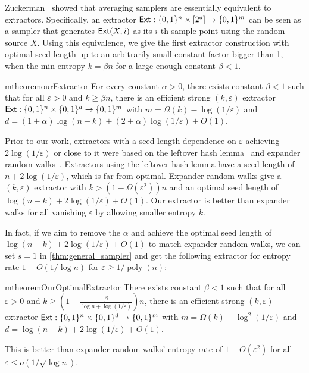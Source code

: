 \documentclass[11pt,letterpaper]{article}
\DeclareMathOperator*{\poly}{poly}
\newcommand{\eps}{\varepsilon}
\newcommand{\1}{\mathbbm{1}}
\newcommand{\zo}{\{0, 1\}}
\newcommand{\Ext}{\textup{\textsf{Ext}}}
\begin{document}
Zuckerman~\cite{zuckerman1997randomness} showed that averaging samplers are essentially equivalent to extractors. Specifically, an extractor $\Ext: \zo^n \times [2^d] \to \zo^m$ can be seen as a sampler that generates $\Ext(X, i)$ as its $i$-th sample point using the random source $X$. Using this equivalence, we give the first extractor construction with optimal seed length up to an arbitrarily small constant factor bigger than 1, when the min-entropy $k = \beta n$ for a large enough constant $\beta < 1$.


\begin{restatable}{mtheorem}{ourExtractor}
    \label{thm:our_extractor}
    For every constant $\alpha > 0$, there exists constant $\beta < 1$ such that for all $\eps > 0$ and $k \ge  \beta n$, there is an efficient strong $(k, \eps)$ extractor $\Ext : \zo^n \times \zo^d \to \zo^m$ with $m = \Omega(k) - \log(1 / \eps)$ and $d = (1 + \alpha)\log (n-k) + (2 + \alpha) \log (1 / \eps) + O(1)$.
\end{restatable}

Prior to our work, extractors with a seed length dependence on $\eps$ achieving $2\log(1/\eps)$ or close to it were based on the leftover hash lemma~\cite{ILL89, BBR, IZ, HILL} and expander random walks~\cite{Gil93, Zuc07}. Extractors using the leftover hash lemma have a seed length of $n + 2 \log(1 / \eps)$, which is far from optimal. Expander random walks give a $(k, \eps)$ extractor with $k > (1 - \Omega(\eps^2))n$ and an optimal seed length of $\log(n - k) + 2\log(1 / \eps) + O(1)$. Our extractor is better than expander walks for all vanishing $\eps$ by allowing smaller entropy $k$.

In fact, if we aim to remove the $\alpha$ and achieve the optimal seed length of $\log(n - k) + 2\log(1 / \eps) + O(1)$ to match expander random walks, we can set $s = 1$ in \cref{thm:general_sampler} and get the following extractor for entropy rate $1-O(1/\log n)$ for $\eps \ge 1/\poly(n)$:

\begin{restatable}{mtheorem}{OurOptimalExtractor}
    \label{thm:our_optimal_extractor}
    There exists constant $\beta < 1$ such that for all $\eps > 0$ and $k \ge ( 1 - \frac{\beta}{\log n + \log(1/\eps)} ) n$, there is an efficient strong $(k, \eps)$ extractor $\Ext : \zo^n \times \zo^d \to \zo^m$ with $m = \Omega(k) - \log^2(1 / \eps)$ and $d = \log (n-k) + 2\log (1 / \eps) + O(1)$.
\end{restatable}


This is better than expander random walks' entropy rate of $1 - O(\eps^2)$ for all $\eps \le o(1 / \sqrt{\log n})$.
\end{document}
